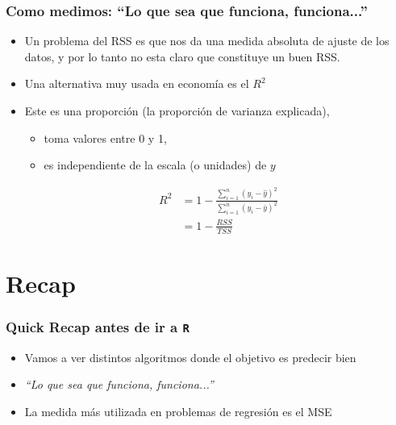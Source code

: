 \documentclass[
  shownotes,
  xcolor={svgnames},
  hyperref={colorlinks,citecolor=DarkBlue,linkcolor=DarkRed,urlcolor=DarkBlue}
  , aspectratio=169]{beamer}
\begin{document}
\begin{frame}
\frametitle{Como medimos: ``Lo que sea que funciona, funciona...''}

\begin{itemize}
\item Un problema del RSS es que nos da una medida absoluta de ajuste de los datos, y por lo tanto no esta claro que constituye un buen RSS.
\medskip
\item Una alternativa muy usada en economía es el $R^2$
\medskip
\item Este es una proporción (la proporción de varianza explicada), 
\begin{itemize}
  \item toma valores entre 0 y 1,
  \item   es independiente de la escala (o unidades) de $y$
 \end{itemize} 
\medskip
\begin{align}
R^2 &= 1 - \frac{\sum_{i=1}^n (y_i - \hat{y} )^2 }{\sum_{i=1}^n (y_i - \bar{y} )^2 }  \\
    &= 1 - \frac{RSS}{TSS} 
\end{align}
\end{itemize}

\end{frame}
\section{Recap}
\begin{frame}[noframenumbering]
\tableofcontents[currentsubsection]

\end{frame}
\begin{frame}
\frametitle{Quick Recap antes de ir a \texttt{R}}

\begin{itemize}
  \item Vamos a ver distintos algoritmos donde el objetivo es predecir bien
  \medskip
  \item {\it ``Lo que sea que funciona, funciona...''}
  \medskip
  \item La medida más utilizada en problemas de regresión es el MSE

\end{itemize}

\end{frame}
\end{document}
